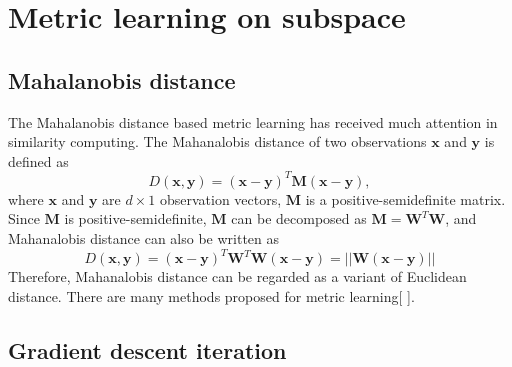 \chapter{Metric learning on subspace}



\section{Mahalanobis distance}
The Mahalanobis distance based metric learning has received much attention in similarity computing. The Mahanalobis distance of two observations $\bm{x} $ and $\bm{y}$ is defined as
\begin{equation}
D(\bm{x},\bm{y}) = (\bm{x} - \bm{y})^T\bm{M}(\bm{x} - \bm{y}), 
\end{equation}
where $\bm{x}$ and $\bm{y} $ are $d\times1$ observation vectors, $\bm{M}$ is a positive-semidefinite matrix. Since $\bm{M}$ is positive-semidefinite, $\bm{M}$ can be decomposed as $\bm{M} = \bm{W}^T\bm{W}$, and Mahanalobis distance can also be written as 
\begin{equation}
D(\bm{x},\bm{y}) = (\bm{x} - \bm{y})^T\bm{W}^T\bm{W}(\bm{x} - \bm{y})= ||\bm{W}(\bm{x} - \bm{y})||
\end{equation}
 Therefore, Mahanalobis distance can be regarded as a variant of Euclidean distance. There are many methods proposed for metric learning[ ]. 
 
 \section{Gradient descent iteration}
 
 
 
